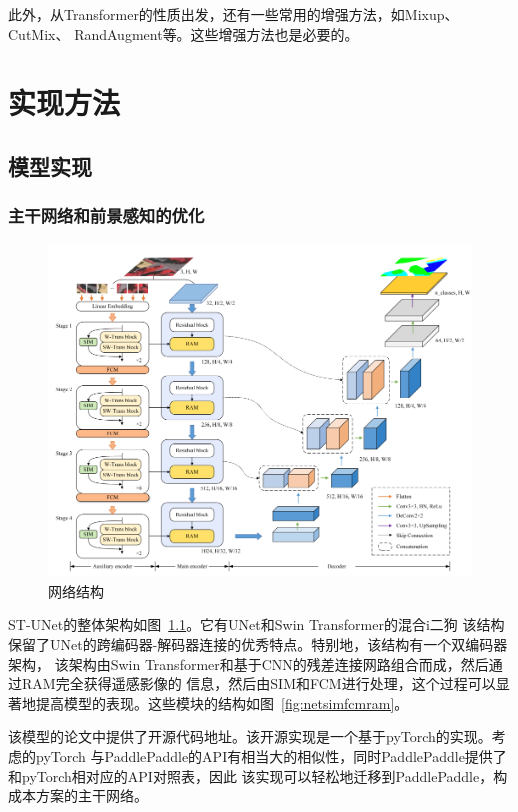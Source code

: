 \documentclass[a4paper,twoside,zihao=5,UTF8]{ctexrep}
\begin{document}
此外，从Transformer的性质出发，还有一些常用的增强方法，如Mixup\cite{mixup}、CutMix\cite{cutmix}、
RandAugment\cite{randaug}等。这些增强方法也是必要的。

\part{实现方法}

\chapter{模型实现}

\section{主干网络和前景感知的优化}

\begin{figure}[htbp]
    \includegraphics[width=\textwidth]{net_arch.png}
    \centering
    \caption{网络结构}
    \label{fig:netarch}
\end{figure}

ST-UNet的整体架构如图~\ref{fig:netarch}。它有UNet和Swin Transformer的混合i二狗
该结构保留了UNet的跨编码器-解码器连接的优秀特点。特别地，该结构有一个双编码器架构，
该架构由Swin Transformer和基于CNN的残差连接网路组合而成，然后通过RAM完全获得遥感影像的
信息，然后由SIM和FCM进行处理，这个过程可以显著地提高模型的表现。这些模块的结构如图~\ref{fig:netsimfcmram}。


该模型的论文\cite{stunet}中提供了开源代码地址。该开源实现是一个基于pyTorch的实现。考虑的pyTorch
与PaddlePaddle的API有相当大的相似性，同时PaddlePaddle提供了和pyTorch相对应的API对照表，因此
该实现可以轻松地迁移到PaddlePaddle，构成本方案的主干网络。
\end{document}
